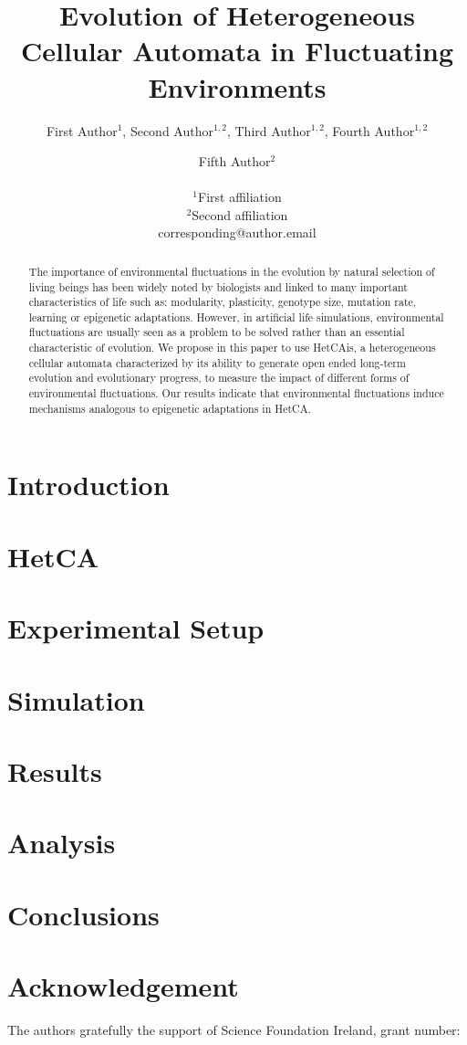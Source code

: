 \documentclass[letterpaper]{article}
\title{Evolution of Heterogeneous Cellular Automata in Fluctuating Environments}
\author{First Author$^{1}$, Second Author$^{1,2}$, Third Author$^{1,2}$, Fourth Author$^{1,2}$ \and Fifth Author$^2$ \\
\mbox{}\\
$^1$First affiliation  \\
$^2$Second affiliation \\
corresponding@author.email}
\begin{document}
\maketitle

\begin{abstract}
The importance of environmental fluctuations in the evolution by natural selection of living beings has been widely noted by biologists and linked to many important characteristics of life such as: modularity, plasticity, genotype size, mutation rate, learning or epigenetic adaptations. However, in artificial life simulations, environmental fluctuations are usually seen as a problem to be solved rather than an essential characteristic of evolution. We propose in this paper to use HetCAis, a heterogeneous cellular automata characterized by its ability to generate open ended long-term evolution and evolutionary progress, to measure the impact of different forms of environmental fluctuations. Our results indicate that environmental fluctuations induce mechanisms analogous to epigenetic adaptations in HetCA.
\end{abstract}



\section{Introduction}\label{sec:intro}


%

\section{HetCA}\label{sec:hetca)}


\section{Experimental Setup}\label{sec:exsetup}


\section{Simulation}\label{sec:method}



\section{Results}\label{sec:method}




\section{Analysis}



\section{Conclusions}\label{sec:conc}


\section{Acknowledgement}
The authors gratefully the support of Science Foundation Ireland, grant number:


\end{document}
